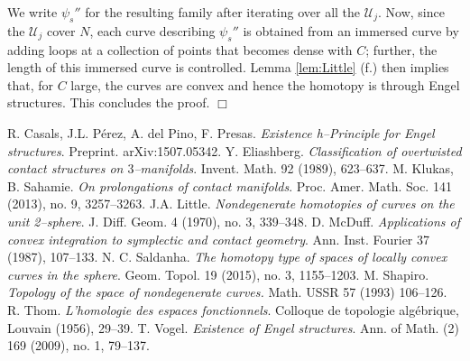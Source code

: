 \documentclass[10pt]{amsart}
\newcommand{\SU}{{\mathcal{U}}}
\theoremstyle{definition}
\begin{document}
We write $\psi_s''$ for the resulting family after iterating over all the $\SU_j$. Now, since the $\SU_j$ cover $N$, each curve describing $\psi_s''$ is obtained from an immersed curve by adding loops at a collection of points that becomes dense with $C$; further, the length of this immersed curve is controlled. Lemma \ref{lem:Little} (f.) then implies that, for $C$ large, the curves are convex and hence the homotopy is through Engel structures. This concludes the proof. \hfill$\Box$




\begin{thebibliography}{9999}
 R. Casals, J.L. P\'erez, A. del Pino, F. Presas. \textsl{Existence h--Principle for Engel structures}. Preprint. arXiv:1507.05342.
 Y. Eliashberg. \textsl{Classification of overtwisted contact structures on $3$--manifolds}. Invent. Math. 92 (1989), 623--637.
 M. Klukas, B. Sahamie. \textsl{On prolongations of contact manifolds}. Proc. Amer. Math. Soc. 141 (2013), no. 9, 3257--3263.
 J.A. Little. \textsl{Nondegenerate homotopies of curves on the unit 2--sphere}. J. Diff. Geom. 4 (1970), no. 3, 339--348.
 D. McDuff. \textsl{Applications of convex integration to symplectic and contact geometry}. Ann. Inst. Fourier 37 (1987), 107--133.
  N. C. Saldanha. \textsl{The homotopy type of spaces of locally convex curves in the sphere}. Geom. Topol. 19 (2015), no. 3, 1155--1203.
 M. Shapiro. \textsl{Topology of the space of nondegenerate curves.} Math. USSR 57 (1993) 106--126.
 R. Thom. \textsl{L'homologie des espaces fonctionnels}. Colloque de topologie alg\'ebrique, Louvain (1956), 29--39.
 T. Vogel. \textsl{Existence of Engel structures}. Ann. of Math. (2) 169 (2009), no. 1, 79--137.
\end{thebibliography}
\end{document}
